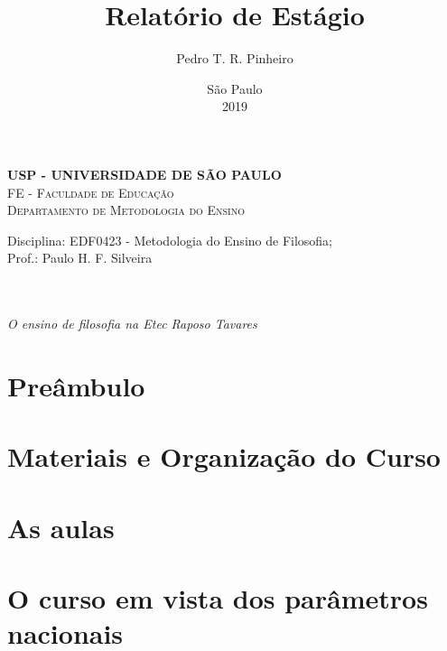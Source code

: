 \documentclass[12pt,a4paper]{article}
\author{Pedro T. R. Pinheiro}
\date{São Paulo\\2019}
\title{Relatório de Estágio}
\newcommand{\subtitulo}{O ensino de filosofia na Etec Raposo Tavares}
\newcommand{\disciplina}{EDF0423 - Metodologia do Ensino de Filosofia}
\newcommand{\departamento}{Departamento de Metodologia do Ensino}
\newcommand{\unidade}{FE - Faculdade de Educação}
\newcommand{\prof}{Paulo H. F. Silveira}
\begin{document}
	\begin{center}
				\textbf{
				\LARGE USP - UNIVERSIDADE DE SÃO PAULO \\
			}
			\Large \textsc{\unidade} \\
			\large \textsc{\departamento}\\
			\vspace*{1cm}
				
			Disciplina: \disciplina; \\Prof.: \prof
			\vfill
			\begin{center}
				{\Large \textsc{\theauthor}} \\ 
				\vspace{1cm}
				\LARGE\textbf{\thetitle} \\
				\Large\emph{\subtitulo}
			\end{center}
			\vfill
			\large\thedate
			\vspace*{1cm}
			\thispagestyle{empty}			
	\end{center}

	\newpage

	\setlength{\parskip}{0.5cm}
	\setlength{\parindent}{1.1cm}
	\onehalfspacing
	
	\section{Preâmbulo}
	

	
	\newpage
	
	\section{Materiais e Organização do Curso}
	

	
	\newpage
	
	\section{As aulas}
	

	
	\newpage
		
	\section{O curso em vista dos parâmetros nacionais}
	

	

	
	\newpage
	
\end{document}
